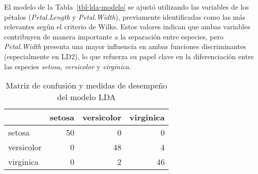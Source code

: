 \documentclass[
  spanish,
  11pt,
  a4paper,
  DIV=11,
  numbers=noendperiod]{scrartcl}
\newenvironment{Shaded}{\begin{snugshade}}{\end{snugshade}}
\newcommand{\CommentTok}[1]{\textcolor[rgb]{0.37,0.37,0.37}{#1}}
\newcommand{\DecValTok}[1]{\textcolor[rgb]{0.68,0.00,0.00}{#1}}
\newcommand{\FunctionTok}[1]{\textcolor[rgb]{0.28,0.35,0.67}{#1}}
\newcommand{\NormalTok}[1]{\textcolor[rgb]{0.00,0.23,0.31}{#1}}
\newcommand{\OtherTok}[1]{\textcolor[rgb]{0.00,0.23,0.31}{#1}}
\newcommand{\SpecialCharTok}[1]{\textcolor[rgb]{0.37,0.37,0.37}{#1}}
\newcommand{\StringTok}[1]{\textcolor[rgb]{0.13,0.47,0.30}{#1}}
\begin{document}
El modelo de la Tabla~\ref{tbl-lda-modelo} se ajustó utilizando las
variables de los pétalos (\emph{Petal.Length} y \emph{Petal.Width}),
previamente identificadas como las más relevantes según el criterio de
Wilks. Estos valores indican que ambas variables contribuyen de manera
importante a la separación entre especies, pero \emph{Petal.Width}
presenta una mayor influencia en ambas funciones discriminantes
(especialmente en LD2), lo que refuerza su papel clave en la
diferenciación entre las especies \emph{setosa}, \emph{versicolor} y
\emph{virginica}.

\begin{Shaded}
\end{Shaded}

\begin{longtable}[]{@{}lrrr@{}}

\caption{\label{tbl-lda-prediccion}Matriz de confusión y medidas de
desempeño del modelo LDA}

\tabularnewline

\toprule\noalign{}
& setosa & versicolor & virginica \\
\midrule\noalign{}
\endhead
\bottomrule\noalign{}
\endlastfoot
setosa & 50 & 0 & 0 \\
versicolor & 0 & 48 & 4 \\
virginica & 0 & 2 & 46 \\

\end{longtable}
\end{document}
